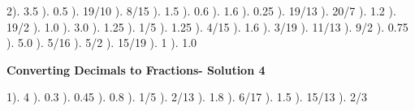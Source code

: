 \documentclass{article}%
\begin{document}
2). 3.5%
). 0.5%
). 19/10%
). 8/15%
). 1.5%
). 0.6%
). 1.6%
). 0.25%
). 19/13%
). 20/7%
). 1.2%
). 19/2%
). 1.0%
). 3.0%
). 1.25%
). 1/5%
). 1.25%
). 4/15%
). 1.6%
). 3/19%
). 11/13%
). 9/2%
). 0.75%
). 5.0%
). 5/16%
). 5/2%
). 15/19%
). 1%
). 1.0%
\newline%
\newpage%
\large%
\begin{center}%
\textbf{Converting Decimals to Fractions- Solution 4}%
\newline%
\end{center} \normalsize%
1). 4%
). 0.3%
). 0.45%
). 0.8%
). 1/5%
). 2/13%
). 1.8%
). 6/17%
). 1.5%
). 15/13%
). 2/3%
\newline%
\end{document}
